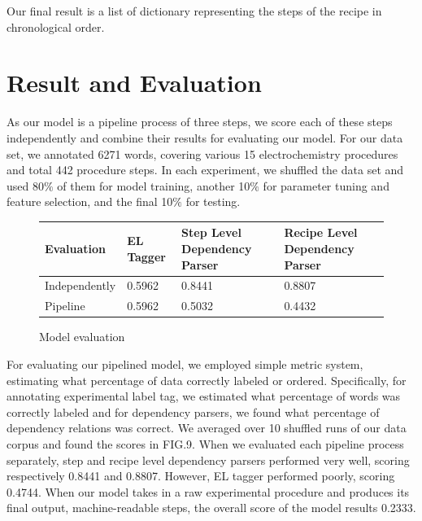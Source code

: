 Our final result is a list of dictionary representing the steps of the recipe in chronological order. 

\section{Result and Evaluation}

As our model is a pipeline process of three steps, we score each of these steps independently and combine their results for evaluating our model. For our data set, we annotated 6271 words, covering various 15 electrochemistry procedures and total 442 procedure steps.  In each experiment, we shuffled the data set and used 80$\%$ of them for model training, another 10$\%$ for parameter tuning and feature selection, and the final 10$\%$ for testing.  

\begin{figure}
  \centering
 	 \begin{tabular}{ |p{2.2cm}||p{2cm}|p{2cm}|p{2cm}|  }
	 \hline
	 Evaluation & EL Tagger & Step Level Dependency Parser & Recipe Level Dependency Parser\\
	 \hline
	Independently   & 0.5962 & 0.8441 &  0.8807\\
 	\hline
	Pipeline &  0.5962  & 0.5032 & 0.4432\\
 	\hline
	\end{tabular}
	
  \caption{Model evaluation}
\end{figure}

For evaluating our pipelined model, we employed simple metric system, estimating what percentage of data correctly labeled or ordered. Specifically, for annotating experimental label tag, we estimated what percentage of words was correctly labeled and for dependency parsers, we found what percentage of dependency relations was correct. We averaged over 10 shuffled runs of our data corpus and found the scores in FIG.9. When we evaluated each pipeline process separately, step and recipe level dependency parsers performed very well, scoring respectively 0.8441 and 0.8807. However, EL tagger performed poorly, scoring 0.4744. When our model takes in a raw experimental procedure and produces its final output, machine-readable steps, the overall score of the model results 0.2333. 

